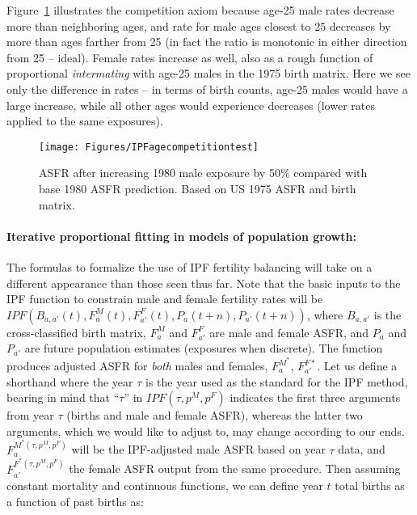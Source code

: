 Figure~\ref{fig:IPFcomp} illustrates the competition axiom because age-25 male
rates decrease more than neighboring ages, and rate for male ages closest to 25
decreases by more than ages farther from 25 (in fact the ratio is monotonic in
either direction from 25 -- ideal). Female rates increase as well, also as a
rough function of proportional \textit{intermating} with age-25 males in the
1975 birth matrix. Here we see only the difference
in rates -- in terms of birth counts, age-25 males would have a large increase,
while all other ages would experience decreases (lower rates applied to the same exposures).

\begin{figure}[ht!]
        \centering  
          \caption{ASFR after increasing 1980 male exposure by 50\% compared
          with base 1980 ASFR prediction. Based on US 1975 ASFR and birth
          matrix.}
           \texttt{[image: Figures/IPFagecompetitiontest]}
          \label{fig:IPFcomp}
\end{figure}

\paragraph{Iterative proportional fitting in models of population growth: }

The formulas to formalize the use of IPF fertility balancing will take on a
different appearance than those seen thus far. Note that the basic inputs to the
IPF function to constrain male and female fertility rates will be
$IPF(B_{a,a'}(t), F_a^M(t), F_{a'}^F(t),P_a(t+n),P_{a'}(t+n))$, where $B_{a,a'}$
is the cross-classified birth matrix, $F_a^M$ and $F_{a'}^F$ are male and female ASFR,
and $P_a$ and $P_{a'}$ are future population estimates (exposures when
discrete). The function produces adjusted ASFR for \textit{both} males and females,
$F_a^{M^\ast}$, $F_{a'}^{F\ast}$. Let us define a shorthand where the year
$\tau$ is the year used as the standard for the IPF method, bearing in mind that
``$\tau$'' in $IPF(\tau, p^M, p^F)$ indicates the first three arguments from
year $\tau$ (births and male and female ASFR), whereas the latter two arguments,
which we would like to adjust to, may change according to our ends. $F_a^{M^\ast(\tau,p^M, p^F)}$
will be the IPF-adjusted male ASFR based on year $\tau$ data, and
$F_{a'}^{F^\ast(\tau,p^M, p^F)}$ the female ASFR output from the same procedure.
Then assuming constant mortality and continuous functions, we can define year
$t$ total births as a function of past births as:

